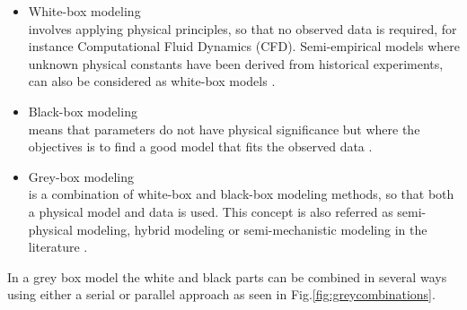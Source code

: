 \begin{itemize}
    \item White-box modeling \\
    involves applying physical principles, so that no observed data is required, for instance Computational Fluid Dynamics (CFD). Semi-empirical models where unknown physical constants have been derived from historical experiments, can also be considered as white-box models \cite{leifsson_grey-box_2008}.  

    \item Black-box modeling \\
    means that parameters do not have physical significance but where the objectives is to find a good model that fits the observed data \cite{lindskog_tools_1995}.
    
    \item Grey-box modeling \\
    is a combination of white-box and black-box modeling methods, so that both a physical model and data is used. This concept is also referred as semi-physical modeling, hybrid modeling or semi-mechanistic modeling in the literature \cite{leifsson_grey-box_2008}. 
\end{itemize}

\noindent In a grey box model the white and black parts can be combined in several ways using either a serial or parallel approach \cite{leifsson_grey-box_2008} as seen in Fig.\ref{fig:greycombinations}. 

